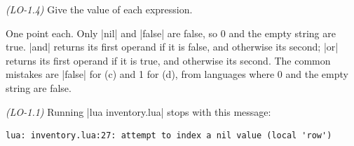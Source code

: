 \documentclass[11pt,addpoints]{exam}
\begin{document}
\begin{questions}
\question[5] \textit{(LO-1.4)} Give the value of each expression.


\begin{solution}
One point each. Only \code|nil| and \code|false| are false, so 0 and the empty string are true.
\code|and| returns its first operand if it is false, and otherwise its second; \code|or| returns
its first operand if it is true, and otherwise its second. The common mistakes are \code|false|
for (c) and 1 for (d), from languages where 0 and the empty string are false.
\end{solution}

\question \textit{(LO-1.1)} Running \code|lua inventory.lua| stops with this message:

\begin{lstlisting}[language={},basicstyle=\ttfamily\small]
lua: inventory.lua:27: attempt to index a nil value (local 'row')
\end{lstlisting}


\end{questions}
\end{document}
